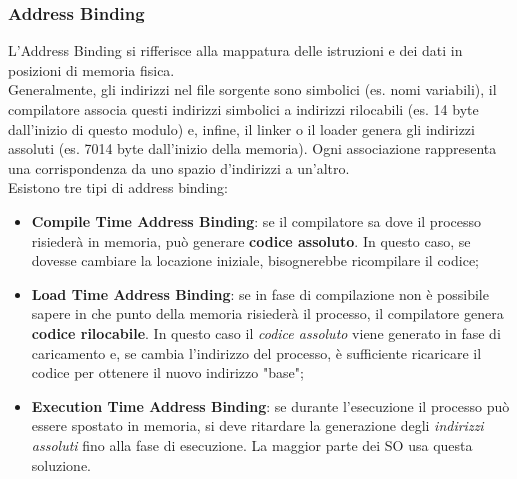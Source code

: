 \documentclass{article}
\begin{document}
			\subsubsection{Address Binding}
				L'Address Binding si rifferisce alla mappatura delle istruzioni e dei dati in posizioni di memoria fisica.
				\\Generalmente, gli indirizzi nel file sorgente sono simbolici (es. nomi variabili), il compilatore associa questi indirizzi simbolici a indirizzi rilocabili (es. 14 byte dall'inizio di questo modulo) e, infine, il linker o il loader genera gli indirizzi assoluti (es. 7014 byte dall'inizio della memoria). Ogni associazione rappresenta una corrispondenza da uno spazio d'indirizzi a un'altro.
				\\Esistono tre tipi di address binding:
				\begin{itemize}
					\item \textbf{Compile Time Address Binding}: se il compilatore sa dove il processo risiederà in memoria, può generare \textbf{codice assoluto}. In questo caso, se dovesse cambiare la locazione iniziale, bisognerebbe ricompilare il codice;
					\item \textbf{Load Time Address Binding}: se in fase di compilazione non è possibile sapere in che punto della memoria risiederà il processo, il compilatore genera \textbf{codice rilocabile}. In questo caso il \textit{codice assoluto} viene generato in fase di caricamento e, se cambia l'indirizzo del processo, è sufficiente ricaricare il codice per ottenere il nuovo indirizzo "base";
					\item \textbf{Execution Time Address Binding}: se durante l'esecuzione il processo può essere spostato in memoria, si deve ritardare la generazione degli \textit{indirizzi assoluti} fino alla fase di esecuzione. La maggior parte dei SO usa questa soluzione.
				\end{itemize}
		
\end{document}
